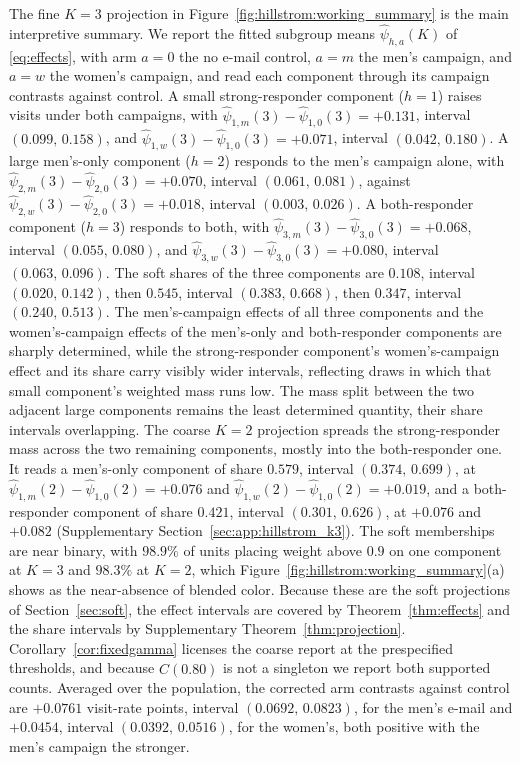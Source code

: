 \documentclass[11pt]{article}
\begin{document}
The fine $K=3$ projection in Figure~\ref{fig:hillstrom:working_summary} is the main interpretive summary. We report the fitted subgroup means $\hat\psi_{h,a}(K)$ of \eqref{eq:effects}, with arm $a=0$ the no e-mail control, $a=m$ the men's campaign, and $a=w$ the women's campaign, and read each component through its campaign contrasts against control. A small strong-responder component ($h=1$) raises visits under both campaigns, with $\hat\psi_{1,m}(3)-\hat\psi_{1,0}(3)=+0.131$, interval $(0.099,\,0.158)$, and $\hat\psi_{1,w}(3)-\hat\psi_{1,0}(3)=+0.071$, interval $(0.042,\,0.180)$. A large men's-only component ($h=2$) responds to the men's campaign alone, with $\hat\psi_{2,m}(3)-\hat\psi_{2,0}(3)=+0.070$, interval $(0.061,\,0.081)$, against $\hat\psi_{2,w}(3)-\hat\psi_{2,0}(3)=+0.018$, interval $(0.003,\,0.026)$. A both-responder component ($h=3$) responds to both, with $\hat\psi_{3,m}(3)-\hat\psi_{3,0}(3)=+0.068$, interval $(0.055,\,0.080)$, and $\hat\psi_{3,w}(3)-\hat\psi_{3,0}(3)=+0.080$, interval $(0.063,\,0.096)$. The soft shares of the three components are $0.108$, interval $(0.020,\,0.142)$, then $0.545$, interval $(0.383,\,0.668)$, then $0.347$, interval $(0.240,\,0.513)$. The men's-campaign effects of all three components and the women's-campaign effects of the men's-only and both-responder components are sharply determined, while the strong-responder component's women's-campaign effect and its share carry visibly wider intervals, reflecting draws in which that small component's weighted mass runs low. The mass split between the two adjacent large components remains the least determined quantity, their share intervals overlapping. The coarse $K=2$ projection spreads the strong-responder mass across the two remaining components, mostly into the both-responder one. It reads a men's-only component of share $0.579$, interval $(0.374,\,0.699)$, at $\hat\psi_{1,m}(2)-\hat\psi_{1,0}(2)=+0.076$ and $\hat\psi_{1,w}(2)-\hat\psi_{1,0}(2)=+0.019$, and a both-responder component of share $0.421$, interval $(0.301,\,0.626)$, at $+0.076$ and $+0.082$ (Supplementary Section~\ref{sec:app:hillstrom_k3}). The soft memberships are near binary, with $98.9\%$ of units placing weight above $0.9$ on one component at $K=3$ and $98.3\%$ at $K=2$, which Figure~\ref{fig:hillstrom:working_summary}(a) shows as the near-absence of blended color. Because these are the soft projections of Section~\ref{sec:soft}, the effect intervals are covered by Theorem~\ref{thm:effects} and the share intervals by Supplementary Theorem~\ref{thm:projection}. Corollary~\ref{cor:fixedgamma} licenses the coarse report at the prespecified thresholds, and because $\widehat C(0.80)$ is not a singleton we report both supported counts. Averaged over the population, the corrected arm contrasts against control are $+0.0761$ visit-rate points, interval $(0.0692,\,0.0823)$, for the men's e-mail and $+0.0454$, interval $(0.0392,\,0.0516)$, for the women's, both positive with the men's campaign the stronger.
\end{document}
